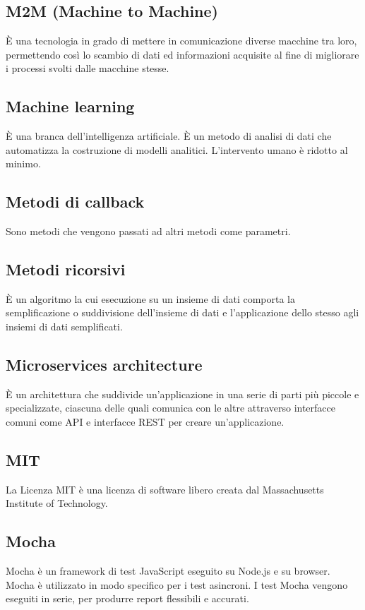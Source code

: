 \section{}

\subsection*{M2M (Machine to Machine)} È una tecnologia in grado di mettere in comunicazione diverse macchine tra loro, permettendo così lo scambio di dati ed informazioni acquisite al fine di migliorare i processi svolti dalle macchine stesse.

\subsection*{Machine learning} È una branca dell'intelligenza artificiale. È un metodo di analisi di dati che automatizza la costruzione di modelli analitici. L'intervento umano è ridotto al minimo.

\subsection*{Metodi di callback} Sono metodi che vengono passati ad altri metodi come parametri.

\subsection*{Metodi ricorsivi} È un algoritmo la cui esecuzione su un insieme di dati comporta la semplificazione o suddivisione dell'insieme di dati e l'applicazione dello stesso agli insiemi di dati semplificati.

\subsection*{Microservices architecture} È un architettura che suddivide un'applicazione in una serie di parti più piccole e specializzate, ciascuna delle quali comunica con le altre attraverso interfacce comuni come API e interfacce REST per creare un’applicazione.

\subsection*{MIT} La Licenza MIT è una licenza di software libero creata dal Massachusetts Institute of Technology.

\subsection*{Mocha} Mocha è un framework di test JavaScript eseguito su Node.js e su browser. Mocha è utilizzato in modo specifico per i test asincroni. I test Mocha vengono eseguiti in serie, per produrre report flessibili e accurati.

